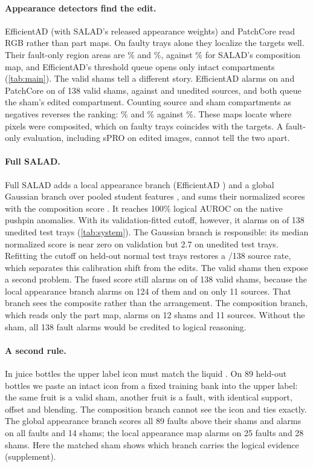 \paragraph{Appearance detectors find the edit.}
EfficientAD (with SALAD's released appearance weights) and PatchCore read RGB rather than part maps. On faulty trays alone they localize the targets well. Their fault-only region areas are \eadRegFault\% and \pcRegFault\%, against \relRegFault\% for SALAD's composition map, and EfficientAD's threshold queue opens only \eadThrW{} intact compartments (\cref{tab:main}). The valid shams tell a different story. EfficientAD alarms on \eadSham{} and PatchCore on \pcSham{} of 138 valid shams, against \eadSrc{} and \pcSrc{} unedited sources, and both queue the sham's edited compartment. Counting source and sham compartments as negatives reverses the ranking: \eadRegAll\% and \pcRegAll\% against \relRegAll\%. These maps locate where pixels were composited, which on faulty trays coincides with the targets. A fault-only evaluation, including sPRO on edited images, cannot tell the two apart.

\paragraph{Full SALAD.}
Full SALAD adds a local appearance branch (EfficientAD \cite{batzner2024}) and a global Gaussian branch over pooled student features \cite{rippel2021}, and sums their normalized scores with the composition score \cite{fucka2025}. It reaches 100\% logical AUROC on the native pushpin anomalies. With its validation-fitted cutoff, however, it alarms on \fullSrcVal{} of 138 unedited test trays (\cref{tab:system}). The Gaussian branch is responsible: its median normalized score is near zero on validation but 2.7 on unedited test trays. Refitting the cutoff on held-out normal test trays restores a \fullSrcX/138 source rate, which separates this calibration shift from the edits. The valid shams then expose a second problem. The fused score still alarms on \fullShamX{} of 138 valid shams, because the local appearance branch alarms on 124 of them and on only 11 sources. That branch sees the composite rather than the arrangement. The composition branch, which reads only the part map, alarms on 12 shams and 11 sources. Without the sham, all 138 fault alarms would be credited to logical reasoning.

\paragraph{A second rule.}
In juice bottles the upper label icon must match the liquid \cite{bergmann2022}. On 89 held-out bottles we paste an intact icon from a fixed training bank into the upper label: the same fruit is a valid sham, another fruit is a fault, with identical support, offset and blending. The composition branch cannot see the icon and ties exactly. The global appearance branch scores all 89 faults above their shams and alarms on all faults and 14 shams; the local appearance map alarms on 25 faults and 28 shams. Here the matched sham shows which branch carries the logical evidence (supplement).

